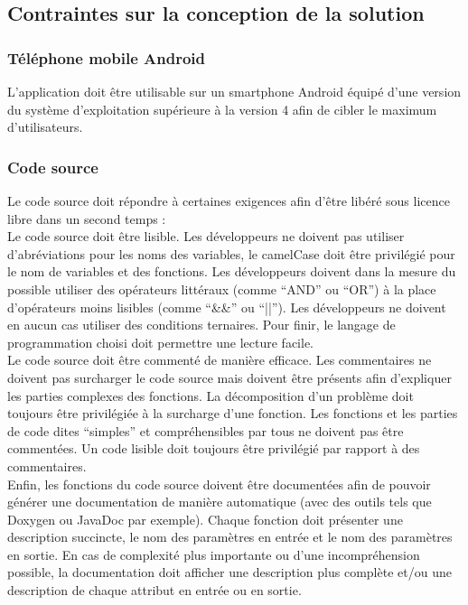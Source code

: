 \subsection{Contraintes sur la conception de la solution} %
\label{sub:contraintes_sur_la_conception_de_la_solution}

	\subsubsection{Téléphone mobile Android}
	L'application doit être utilisable sur un smartphone Android équipé d'une version du système d'exploitation supérieure à la version 4 afin de cibler le maximum d'utilisateurs.

	\subsubsection{Code source}
	Le code source doit répondre à certaines exigences afin d'être libéré sous licence libre dans un second temps :\\

	Le code source doit être lisible. Les développeurs ne doivent pas utiliser d’abréviations pour les noms des variables, le camelCase doit être privilégié pour le nom de variables et des fonctions. Les développeurs doivent dans la mesure du possible utiliser des opérateurs littéraux (comme ``AND'' ou ``OR'') à la place d'opérateurs moins lisibles (comme ``\&\&'' ou ``||''). Les développeurs ne doivent en aucun cas utiliser des conditions ternaires. Pour finir, le langage de programmation choisi doit permettre une lecture facile.\\

	Le code source doit être commenté de manière efficace. Les commentaires ne doivent pas surcharger le code source mais doivent être présents afin d'expliquer les parties complexes des fonctions. La décomposition d'un problème doit toujours être privilégiée à la surcharge d'une fonction. Les fonctions et les parties de code dites ``simples'' et compréhensibles par tous ne doivent pas être commentées. Un code lisible doit toujours être privilégié par rapport à des commentaires.\\

	Enfin, les fonctions du code source doivent être documentées afin de pouvoir générer une documentation de manière automatique (avec des outils tels que Doxygen ou JavaDoc par exemple). Chaque fonction doit présenter une description succincte, le nom des paramètres en entrée et le nom des paramètres en sortie. En cas de complexité plus importante ou d'une incompréhension possible, la documentation doit afficher une description plus complète et/ou une description de chaque attribut en entrée ou en sortie.


